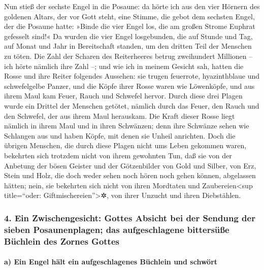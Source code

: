  Nun stieß der sechste Engel in die Posaune: da hörte ich
aus den vier Hörnern des goldenen Altars, der vor Gott steht, eine
Stimme,  die gebot dem sechsten Engel, der die Posaune
hatte: »Binde die vier Engel los, die am großen Strome Euphrat gefesselt
sind!«  Da wurden die vier Engel losgebunden, die auf
Stunde und Tag, auf Monat und Jahr in Bereitschaft standen, um den
dritten Teil der Menschen zu töten.  Die Zahl der Scharen
des Reiterheeres betrug zweihundert Millionen -- ich hörte nämlich ihre
Zahl --;  und wie ich in meinem Gesicht sah, hatten die
Rosse und ihre Reiter folgendes Aussehen: sie trugen feuerrote,
hyazinthblaue und schwefelgelbe Panzer, und die Köpfe ihrer Rosse waren
wie Löwenköpfe, und aus ihrem Maul kam Feuer, Rauch und Schwefel hervor.
 Durch diese drei Plagen wurde ein Drittel der Menschen
getötet, nämlich durch das Feuer, den Rauch und den Schwefel, der aus
ihrem Maul herauskam.  Die Kraft dieser Rosse liegt
nämlich in ihrem Maul und in ihren Schwänzen; denn ihre Schwänze sehen
wie Schlangen aus und haben Köpfe, mit denen sie Unheil anrichten.
 Doch die übrigen Menschen, die durch diese Plagen nicht
ums Leben gekommen waren, bekehrten sich trotzdem nicht von ihrem
gewohnten Tun, daß sie von der Anbetung der bösen Geister und der
Götzenbilder von Gold und Silber, von Erz, Stein und Holz, die doch
weder sehen noch hören noch gehen können, abgelassen hätten;
 nein, sie bekehrten sich nicht von ihren Mordtaten und
Zaubereien\textless sup title=``oder: Giftmischereien''\textgreater✲,
von ihrer Unzucht und ihren Diebstählen.

\hypertarget{ein-zwischengesicht-gottes-absicht-bei-der-sendung-der-sieben-posaunenplagen-das-aufgeschlagene-bittersuxfcuxdfe-buxfcchlein-des-zornes-gottes}{%
\subsubsection{4. Ein Zwischengesicht: Gottes Absicht bei der Sendung
der sieben Posaunenplagen; das aufgeschlagene bittersüße Büchlein des
Zornes
Gottes}\label{ein-zwischengesicht-gottes-absicht-bei-der-sendung-der-sieben-posaunenplagen-das-aufgeschlagene-bittersuxfcuxdfe-buxfcchlein-des-zornes-gottes}}

\hypertarget{a-ein-engel-huxe4lt-ein-aufgeschlagenes-buxfcchlein-und-schwuxf6rt}{%
\paragraph{a) Ein Engel hält ein aufgeschlagenes Büchlein und
schwört}\label{a-ein-engel-huxe4lt-ein-aufgeschlagenes-buxfcchlein-und-schwuxf6rt}}


